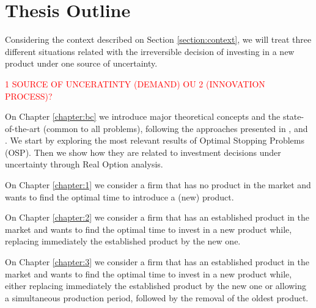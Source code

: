 



\section{Thesis Outline}
\label{section:outline}

Considering the context described on Section \ref{section:context}, we will treat three different situations related with the irreversible decision of investing in a new product under one source of uncertainty.

\textcolor{red}{1 SOURCE OF UNCERATINTY (DEMAND) OU 2 (INNOVATION PROCESS)?}

On Chapter \ref{chapter:bc} we introduce major theoretical concepts and the state-of-the-art (common to all problems), following the approaches presented in \cite{dixit:book}, \cite{ross} and \cite{oksendal:book}.
We start by exploring the most relevant results of Optimal Stopping Problems (OSP). Then we show how they are related to investment decisions under uncertainty through Real Option analysis.

On Chapter \ref{chapter:1} we consider a firm that has no product in the market and wants to find the optimal time to introduce a (new) product.

On Chapter \ref{chapter:2} we consider a firm that has an established product in the market and wants to find the optimal time to invest in a new product while, replacing immediately the established product by the new one. 

On Chapter \ref{chapter:3} we consider a firm that has an established product in the market and wants to find the optimal time to invest in a new product while, either replacing immediately the established product by the new one or allowing a simultaneous production period, followed by the removal of the oldest product.

